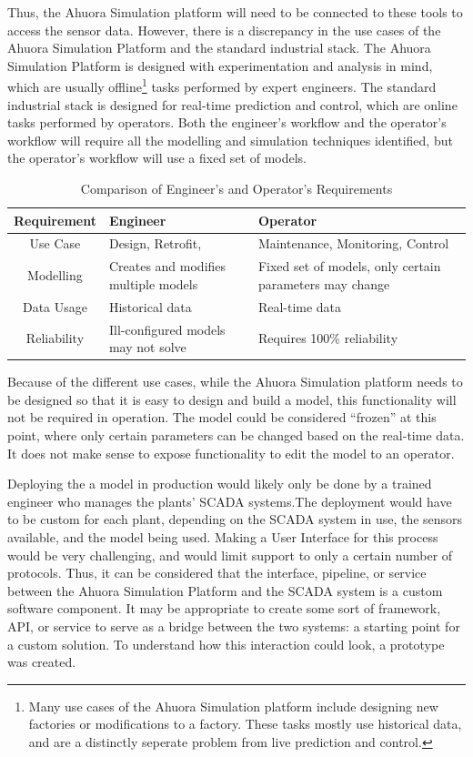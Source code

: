 \documentclass[12pt]{report}
\begin{document}
 Thus, the Ahuora Simulation platform will need to be connected to these tools to access the sensor data. However, there is a discrepancy in the use cases of the Ahuora Simulation Platform and the standard industrial stack. The Ahuora Simulation Platform is designed with experimentation and analysis in mind, which are usually offline\footnote{Many use cases of the Ahuora Simulation platform include designing new factories or modifications to a factory. These tasks mostly use historical data, and are a distinctly seperate problem from live prediction and control.} tasks performed by expert engineers. The standard industrial stack is designed for real-time prediction and control, which are online tasks performed by operators. Both the engineer's workflow and the operator's workflow will require all the modelling and simulation techniques identified, but the operator's workflow will use a fixed set of models.

\begin{table}[ht]
    \centering
    \caption{Comparison of Engineer's and Operator's Requirements}
    \begin{tabular}{|c|p{}|p{}|}
        \hline
        \textbf{Requirement} & \textbf{Engineer} & \textbf{Operator} \\
        \hline
        Use Case & Design, Retrofit, & Maintenance, Monitoring, Control \\
        \hline
        Modelling & Creates and modifies multiple models & Fixed set of models, only certain parameters may change\\
        \hline
        Data Usage & Historical data & Real-time data \\
        \hline
        Reliability & Ill-configured models may not solve & Requires 100\% reliability \\
        \hline
    \end{tabular}
    \label{tab:requirements}
\end{table}

Because of the different use cases, while the Ahuora Simulation platform needs to be designed so that it is easy to design and build a model, this functionality will not be required in operation. The model could be considered ``frozen'' at this point, where only certain parameters can be changed based on the real-time data. It does not make sense to expose functionality to edit the model to an operator. 



Deploying the a model in production would likely only be done by a trained engineer who manages the plants' SCADA systems.The deployment would have to be custom for each plant, depending on the SCADA system in use, the sensors available, and the model being used. Making a User Interface for this process would be very challenging, and would limit support to only a certain number of protocols. Thus, it can be considered that the interface, pipeline, or service between the Ahuora Simulation Platform and the SCADA system is a custom software component. It may be appropriate to create some sort of framework, API, or service to serve as a bridge between the two systems: a starting point for a custom solution. To understand how this interaction could look, a prototype was created. 
\end{document}
